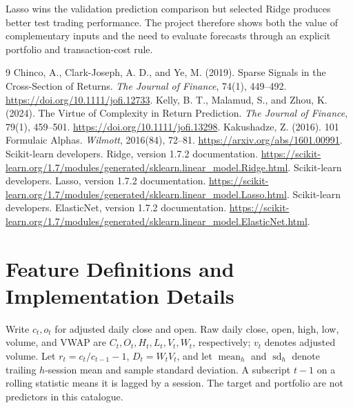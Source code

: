 \documentclass[11pt,a4paper]{article}
\begin{document}
Lasso wins the validation prediction comparison but selected Ridge produces
better test trading performance. The project therefore shows both the value
of complementary inputs and the need to evaluate forecasts through an
explicit portfolio and transaction-cost rule.

\clearpage
\begin{thebibliography}{9}
Chinco, A., Clark-Joseph, A. D., and Ye, M. (2019).
Sparse Signals in the Cross-Section of Returns.
\emph{The Journal of Finance}, 74(1), 449--492.
\url{https://doi.org/10.1111/jofi.12733}.
Kelly, B. T., Malamud, S., and Zhou, K. (2024).
The Virtue of Complexity in Return Prediction.
\emph{The Journal of Finance}, 79(1), 459--501.
\url{https://doi.org/10.1111/jofi.13298}.
Kakushadze, Z. (2016). 101 Formulaic Alphas.
\emph{Wilmott}, 2016(84), 72--81.
\url{https://arxiv.org/abs/1601.00991}.
Scikit-learn developers. Ridge, version 1.7.2 documentation.
\url{https://scikit-learn.org/1.7/modules/generated/sklearn.linear_model.Ridge.html}.
Scikit-learn developers. Lasso, version 1.7.2 documentation.
\url{https://scikit-learn.org/1.7/modules/generated/sklearn.linear_model.Lasso.html}.
Scikit-learn developers. ElasticNet, version 1.7.2 documentation.
\url{https://scikit-learn.org/1.7/modules/generated/sklearn.linear_model.ElasticNet.html}.
\end{thebibliography}

\clearpage
\appendix
\section{Feature Definitions and Implementation Details}
\label{app:basic}
Write $c_t,o_t$ for adjusted daily close and open. Raw daily close, open,
high, low, volume, and VWAP are $C_t,O_t,H_t,L_t,V_t,W_t$, respectively;
$v_t$ denotes adjusted volume.
Let $r_t=c_t/c_{t-1}-1$, $D_t=W_tV_t$, and let $\operatorname{mean}_h$ and
$\operatorname{sd}_h$ denote trailing $h$-session mean and sample standard
deviation. A subscript $t-1$ on a rolling statistic means it is lagged by a
session. The target and portfolio are not predictors in this catalogue.
\end{document}
